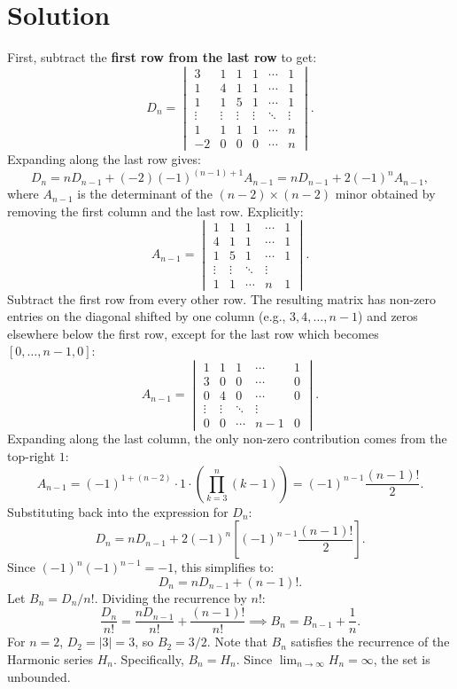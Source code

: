 \documentclass[amssymb,pra,12pt,aps,notitlepage]{revtex4-1}
\begin{document}
\section{Solution}
First, subtract the \textbf{first row from the last row} to get:
\[
D_n = \begin{vmatrix}
3 & 1 & 1 & 1 & \cdots & 1 \\
1 & 4 & 1 & 1 & \cdots & 1 \\
1 & 1 & 5 & 1 & \cdots & 1 \\
\vdots & \vdots & \vdots & \vdots & \ddots & \vdots \\
1 & 1 & 1 & 1 & \cdots & n \\
-2 & 0 & 0 & 0 & \cdots & n
\end{vmatrix}.
\]
Expanding along the last row gives:
\[
D_n = nD_{n-1} + (-2)(-1)^{(n-1)+1} A_{n-1} = nD_{n-1} + 2(-1)^{n} A_{n-1},
\]
where $A_{n-1}$ is the determinant of the $(n-2) \times (n-2)$ minor obtained by removing the first column and the last row. Explicitly:
\[
A_{n-1} = \begin{vmatrix}
1 & 1 & 1 & \cdots & 1 \\
4 & 1 & 1 & \cdots & 1 \\
1 & 5 & 1 & \cdots & 1 \\
\vdots & \vdots & \ddots & \vdots \\
1 & 1 & \cdots & n & 1
\end{vmatrix}.
\]
Subtract the first row from every other row. The resulting matrix has non-zero entries on the diagonal shifted by one column (e.g., $3, 4, \dots, n-1$) and zeros elsewhere below the first row, except for the last row which becomes $[0, \dots, n-1, 0]$:
\[
A_{n-1} = \begin{vmatrix}
1 & 1 & 1 & \cdots & 1 \\
3 & 0 & 0 & \cdots & 0 \\
0 & 4 & 0 & \cdots & 0 \\
\vdots & \vdots & \ddots & \vdots \\
0 & 0 & \cdots & n-1 & 0
\end{vmatrix}.
\]
Expanding along the last column, the only non-zero contribution comes from the top-right $1$:
\[
A_{n-1} = (-1)^{1+(n-2)} \cdot 1 \cdot \left( \prod_{k=3}^{n} (k-1) \right) = (-1)^{n-1} \frac{(n-1)!}{2}.
\]
Substituting back into the expression for $D_n$:
\[
D_n = nD_{n-1} + 2(-1)^{n} \left[ (-1)^{n-1} \frac{(n-1)!}{2} \right].
\]
Since $(-1)^n (-1)^{n-1} = -1$, this simplifies to:
\[
D_n = nD_{n-1} + (n-1)!.
\]
Let $B_n = D_n/n!$. Dividing the recurrence by $n!$:
\[
\frac{D_n}{n!} = \frac{nD_{n-1}}{n!} + \frac{(n-1)!}{n!} \implies B_n = B_{n-1} + \frac{1}{n}.
\]
For $n=2$, $D_2 = |3| = 3$, so $B_2 = 3/2$. Note that $B_n$ satisfies the recurrence of the Harmonic series $H_n$. Specifically, $B_n = H_n$. Since $\lim_{n \to \infty} H_n = \infty$, the set is unbounded.
\end{document}
